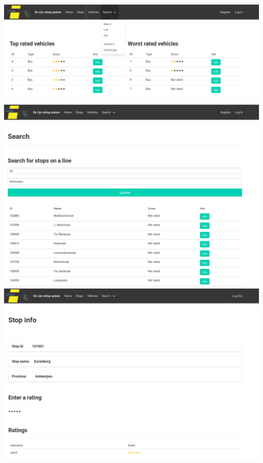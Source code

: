 \documentclass[12pt,a4paper]{article}
\begin{document}
\includegraphics[scale=0.3]{search-bar}\\
\includegraphics[scale=0.3]{search}\\
\includegraphics[scale=0.3]{stopInfo}\\
\end{document}
